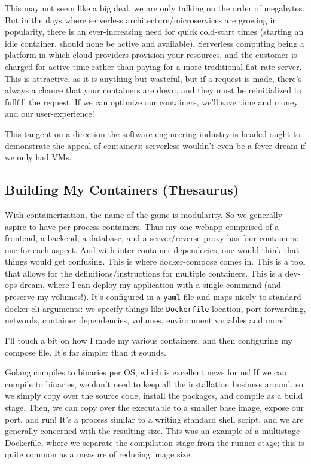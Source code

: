 \documentclass[11pt, twoside, reqno]{book}
\begin{document}
This may not seem like a big deal, we are only talking on the order of megabytes. But in the days where serverless architecture/microservices are growing in popularity, there is an ever-increasing need for quick cold-start times (starting an idle container, should none be active and available). Serverless computing being a platform in which cloud providers provision your resources, and the customer is charged for active time rather than paying for a more traditional flat-rate server. This is attractive, as it is anything but wasteful, but if a request is made, there's always a chance that your containers are down, and they must be reinitialized to fullfill the request. If we can optimize our containers, we'll save time and money and our user-experience!

This tangent on a direction the software engineering industry is headed ought to demonstrate the appeal of containers: serverless wouldn't even be a fever dream if we only had VMs.

\subsection{Building My Containers (Thesaurus)}

With containerization, the name of the game is modularity. So we generally aspire to have per-process containers. Thus my one webapp comprised of a frontend, a backend, a database, and a server/reverse-proxy has four containers: one for each aspect. And with inter-container dependecies, one would think that things would get confusing. This is where docker-compose comes in. This is a tool that allows for the definitions/instructions for multiple containers. This is a dev-ops dream, where I can deploy my application with a single command (and preserve my volumes!). It's configured in a \texttt{yaml} file and maps nicely to standard docker cli arguments: we specify things like \texttt{Dockerfile} location, port forwarding, networds, container dependencies, volumes, environment variables and more!

I'll touch a bit on how I made my various containers, and then configuring my compose file. It's far simpler than it sounds.

\label{Go Backend Dockerfile}

Golang compiles to binaries per OS, which is excellent news for us! If we can compile to binaries, we don't need to keep all the installation business around, so we simply copy over the source code, install the packages, and compile as a build stage. Then, we can copy over the executable to a smaller base image, expose our port, and run! It's a process similar to a writing standard shell script, and we are generally concerned with the resulting size. This was an example of a multistage Dockerfile, where we separate the compilation stage from the runner stage; this is quite common as a measure of reducing image size.
\end{document}
